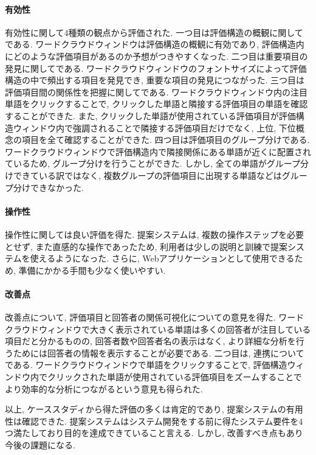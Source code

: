 \documentclass[syuuron]{kuee}
\begin{document}
		\paragraph{有効性}
		有効性に関して4種類の観点から評価された. 
		一つ目は評価構造の概観に関してである. 
		ワードクラウドウィンドウは評価構造の概観に有効であり, 評価構造内にどのような評価項目があるのか予想がつきやすくなった. 
		二つ目は重要項目の発見に関してである. 
		ワードクラウドウィンドウのフォントサイズによって評価構造の中で頻出する項目を発見でき, 
		重要な項目の発見につながった. 
		三つ目は評価項目間の関係性を把握に関してである. 
		ワードクラウドウィンドウ内の注目単語をクリックすることで, クリックした単語と隣接する評価項目の単語を確認することができた. 
		また, クリックした単語が使用されている評価項目が評価構造ウィンドウ内で強調されることで隣接する評価項目だけでなく, 
		上位, 下位概念の項目を全て確認することができた. 
		四つ目は評価項目のグループ分けである. 
		ワードクラウドウィンドウで評価構造内で隣接関係にある単語が近くに配置されているため, グループ分けを行うことができた. 
		しかし, 全ての単語がグループ分けできている訳ではなく, 複数グループの評価項目に出現する単語などはグループ分けできなかった. 
		
		\paragraph{操作性}
		操作性に関しては良い評価を得た. 
		提案システムは, 複数の操作ステップを必要とせず, また直感的な操作であったため, 利用者は少しの説明と訓練で提案システムを使えるようになった. 
		さらに, Webアプリケーションとして使用できるため, 準備にかかる手間も少なく使いやすい. 
		
		\paragraph{改善点}
		改善点について, 評価項目と回答者の関係可視化についての意見を得た. 
		ワードクラウドウィンドウで大きく表示されている単語は多くの回答者が注目している項目だと分かるものの, 
		回答者数や回答者名の表示はなく, より詳細な分析を行うためには回答者の情報を表示することが必要である. 
		二つ目は, 連携についてである. 
		ワードクラウドウィンドウで単語をクリックすることで, 
		評価構造ウィンドウ内でクリックされた単語が使用されている評価項目をズームすることで
		より効率的な分析につながるという意見も得られた. 
		
		以上, ケーススタディから得た評価の多くは肯定的であり, 提案システムの有用性は確認できた. 
		提案システムはシステム開発をする前に得たシステム要件を4つ満たしており目的を達成できていること言える. 
		しかし, 改善すべき点もあり今後の課題になる. 
		
\end{document}
